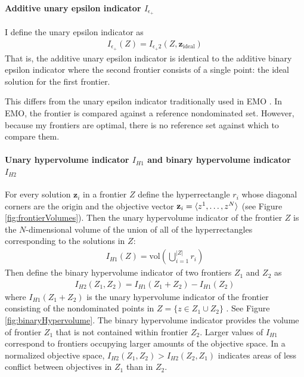\paragraph{Additive unary epsilon indicator $I_{\epsilon_+}$} I define the unary epsilon indicator as
\begin{align}
I_{\epsilon_+} (Z) = I_{\epsilon_+2} (Z,\mathbf{z}_{\text{ideal}})
\end{align}
That is, the additive unary epsilon indicator is identical to the additive binary epsilon indicator where the second frontier consists of a single point: the ideal solution for the first frontier.

This differs from the unary epsilon indicator traditionally used in EMO \cite{zitzler2003performance}. In EMO, the frontier is compared against a reference nondominated set. However, because my frontiers are optimal, there is no reference set against which to compare them.

\paragraph{Unary hypervolume indicator $I_{H1}$ and binary hypervolume indicator $I_{H2}$}
For every solution $\mathbf{z}_i$ in a frontier $Z$ define the hyperrectangle $r_i$ whose diagonal corners are the origin and the objective vector $\mathbf{z}_i = \braket{z^1,\ldots,z^N}$ (see Figure \ref{fig:frontierVolumes}). Then the unary hypervolume indicator of the frontier $Z$ is the $N$-dimensional volume of the union of all of the hyperrectangles corresponding to the solutions in $Z$:
\begin{align}
I_{H1} (Z) = \text{vol} \left( \bigcup_{i = 1}^{|Z|} r_i \right)
\end{align}
Then define the binary hypervolume indicator of two frontiers $Z_1$ and $Z_2$ as \cite{zitzler1999evolutionary}
\begin{align}
I_{H2} (Z_1,Z_2) = I_{H1} (Z_1 + Z_2) - I_{H1} (Z_2)
\end{align}
where $I_{H1} (Z_1 + Z_2)$ is the unary hypervolume indicator of the frontier consisting of the nondominated points in $Z = \{z \in Z_1 \cup Z_2\}$ . See Figure \ref{fig:binaryHypervolume}. The binary hypervolume indicator provides the volume of frontier $Z_1$ that is not contained within frontier $Z_2$. Larger values of $I_{H1}$ correspond to frontiers occupying larger amounts of the objective space. In a normalized objective space, $I_{H2}(Z_1, Z_2) > I_{H2}(Z_2, Z_1)$ indicates areas of less conflict between objectives in $Z_1$ than in $Z_2$.


